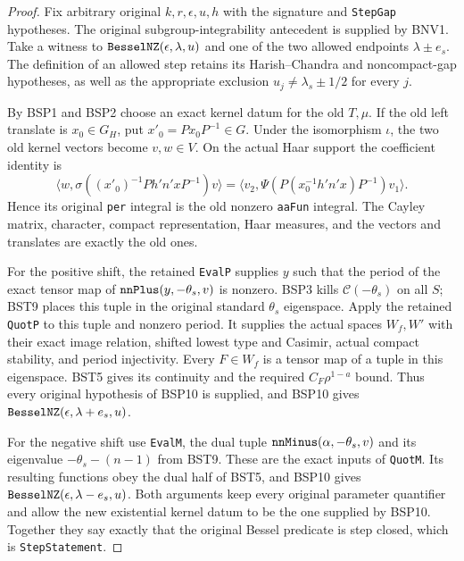 \documentclass[11pt,a4paper]{article}
\numberwithin{equation}{section}
\theoremstyle{remark}\newtheorem{remark}[theorem]{Remark}
\begin{document}
\begin{proof}
Fix arbitrary original $k,r,\epsilon,u,h$ with the signature and
\texttt{Step\allowbreak Gap} hypotheses.  The original subgroup-integrability
antecedent is supplied by BNV1.
Take a witness to $\texttt{Bessel\allowbreak NZ}(\epsilon,\lambda,u)$ and
one of the two allowed endpoints $\lambda\pm e_s$.
The definition of an allowed step retains its Harish--Chandra and
noncompact-gap hypotheses, as well as the appropriate exclusion
$u_j\ne\lambda_s\pm1/2$ for every $j$.

By BSP1 and BSP2 choose an exact kernel datum for the old
$T,\mu$.  If the old left translate is $x_0\in G_H$, put
$x'_0=Px_0P^{-1}\in G$.  Under the isomorphism $\iota$,
the two old kernel vectors become $v,w\in V$.
On the actual Haar support the coefficient identity is
\[
 \langle w,\sigma((x'_0)^{-1}P h'n'xP^{-1})v\rangle
 =
 \langle v_2,\Psi(P(x_0^{-1}h'n'x)P^{-1})v_1\rangle.
 \tag{BST.36}
\]
Hence its original \texttt{per} integral is the old nonzero
\texttt{aa\allowbreak Fun} integral.  The Cayley matrix, character, compact
representation, Haar measures, and the vectors and translates
are exactly the old ones.

For the positive shift, the retained \texttt{Eval\allowbreak P} supplies $y$
such that the period of the exact tensor map of
$\texttt{nn\allowbreak Plus}(y,-\theta_s,v)$ is nonzero.
BSP3 kills $\mathcal C(-\theta_s)$ on all $S$; BST9 places this
tuple in the original standard $\theta_s$ eigenspace.
Apply the retained \texttt{Quot\allowbreak P} to this tuple and nonzero period.
It supplies the actual spaces $W_f,W'$ with their exact image
relation, shifted lowest type and Casimir, actual compact stability,
and period injectivity.
Every $F\in W_f$ is a tensor map of a tuple in this eigenspace.
BST5 gives its continuity and the required
$C_F\rho^{1-a}$ bound.  Thus every original hypothesis of
BSP10 is supplied, and BSP10 gives
$\texttt{Bessel\allowbreak NZ}(\epsilon,\lambda+e_s,u)$.

For the negative shift use \texttt{Eval\allowbreak M}, the dual tuple
$\texttt{nn\allowbreak Minus}(\alpha,-\theta_s,v)$ and its eigenvalue
$-\theta_s-(n-1)$ from BST9.  These are the exact inputs of
\texttt{Quot\allowbreak M}.  Its resulting functions obey the dual half of
BST5, and BSP10 gives
$\texttt{Bessel\allowbreak NZ}(\epsilon,\lambda-e_s,u)$.
Both arguments keep every original parameter quantifier and allow
the new existential kernel datum to be the one supplied by BSP10.
Together they say exactly that the original Bessel predicate is
step closed, which is \texttt{Step\allowbreak Statement}.
\end{proof}
\end{document}
